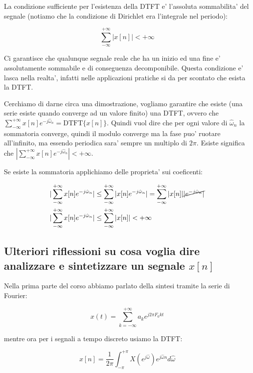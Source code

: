 La condizione sufficiente per l'esistenza della DTFT e' l'assoluta sommabilita' del segnale (notiamo che la condizione di Dirichlet era l'integrale nel periodo):

\begin{equation}
    \sum_{-\infty}^{+\infty} |x[n]| < + \infty
\end{equation}

Ci garantisce che qualunque segnale reale che ha un inizio ed una fine e' assolutamente sommabile e di conseguenza decomponibile. Questa condizione e' lasca nella realta', infatti nelle applicazioni pratiche si da per scontato che esista la DTFT.

Cerchiamo di darne circa una dimostrazione, vogliamo garantire che esiste (una serie esiste quando converge ad un valore finito) una DTFT, ovvero che $\sum_{-\infty}^{+\infty} x[n] e^{-j \hat{\omega}_n} = \mbox{DTFT}\{ x[n] \}$.
Quindi vuol dire che per ogni valore di $\hat{\omega}_n$ la sommatoria converge, quindi il modulo converge ma la fase puo' ruotare all'infinito, ma essendo periodica sara' sempre un multiplo di $2\pi$. Esiste significa che $|\sum_{-\infty}^{+\infty} x[n] e^{-j \hat{\omega}_n}| < +\infty$.

Se esiste la sommatoria applichiamo delle proprieta' sui coeficenti:

\[\begin{split}
    &|\sum_{-\infty}^{+\infty} x[n] e^{-j \hat{\omega}_n}| \le \sum_{-\infty}^{+\infty} |x[n] e^{-j \hat{\omega}_n}| = \sum_{-\infty}^{+\infty} |x[n]| \cancel{|e^{-j \hat{\omega}_n}|} \\
    &|\sum_{-\infty}^{+\infty} x[n] e^{-j \hat{\omega}_n}| \le \sum_{-\infty}^{+\infty} |x[n]| < + \infty
\end{split}\]

\subsection{Ulteriori riflessioni su cosa voglia dire analizzare e sintetizzare un segnale $x[n]$}

Nella prima parte del corso abbiamo parlato della sintesi tramite la serie di Fourier:

\[
    x(t) = \sum_{k = -\infty}^{+\infty} a_k e^{j 2\pi F_0 k t}
\]

mentre ora per i segnali a tempo discreto usiamo la DTFT:

\[
    x[n] = \frac{1}{2\pi} \int_{-\pi}^{+\pi} X(e^{j \hat{\omega}}) e^{j \hat{\omega}n} d\hat{\omega}
\]

